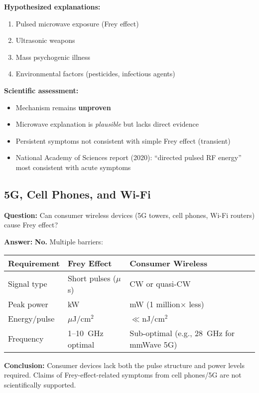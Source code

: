 \textbf{Hypothesized explanations:}
\begin{enumerate}
\item Pulsed microwave exposure (Frey effect)
\item Ultrasonic weapons
\item Mass psychogenic illness
\item Environmental factors (pesticides, infectious agents)
\end{enumerate}

\textbf{Scientific assessment:}
\begin{itemize}
\item Mechanism remains \textbf{unproven}
\item Microwave explanation is \emph{plausible} but lacks direct evidence
\item Persistent symptoms not consistent with simple Frey effect (transient)
\item National Academy of Sciences report (2020): ``directed pulsed RF energy'' most consistent with acute symptoms
\end{itemize}

\subsection{5G, Cell Phones, and Wi-Fi}

\textbf{Question:} Can consumer wireless devices (5G towers, cell phones, Wi-Fi routers) cause Frey effect?

\textbf{Answer:} \textbf{No.} Multiple barriers:

\begin{center}
\begin{tabular}{@{}lll@{}}
\toprule
\textbf{Requirement} & \textbf{Frey Effect} & \textbf{Consumer Wireless} \\
\midrule
Signal type & Short pulses ($\mu$s) & CW or quasi-CW \\
Peak power & kW & mW (1 million$\times$ less) \\
Energy/pulse & $\mu$J/cm$^2$ & $\ll$nJ/cm$^2$ \\
Frequency & 1--10~GHz optimal & Sub-optimal (e.g., 28~GHz for mmWave 5G) \\
\bottomrule
\end{tabular}
\end{center}

\textbf{Conclusion:} Consumer devices lack both the pulse structure and power levels required. Claims of Frey-effect-related symptoms from cell phones/5G are not scientifically supported.

